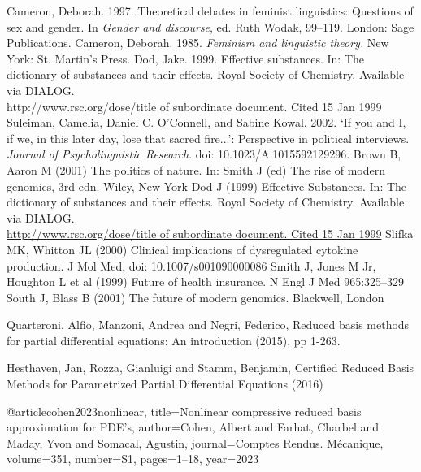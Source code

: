 \begin{thebibliography}{99.}
%
 Cameron, Deborah. 1997. Theoretical debates in feminist linguistics: Questions of sex and gender. In \textit{Gender and discourse}, ed. Ruth Wodak, 99--119. London: Sage Publications.
%
 Cameron, Deborah. 1985. \textit{Feminism and linguistic theory.} New York: St. Martin's Press.
%
 Dod, Jake. 1999. Effective substances. In: The dictionary of substances and their effects. Royal Society of Chemistry. Available via DIALOG. \\
http://www.rsc.org/dose/title of subordinate document. Cited 15 Jan 1999
%
 Suleiman, Camelia, Daniel C. O'Connell, and Sabine Kowal. 2002. `If you and I, if we, in this later day, lose that sacred fire...': Perspective in political interviews. \textit{Journal of Psycholinguistic Research}. doi: 10.1023/A:1015592129296.
%
%
%
%
%
%
%
 Brown B, Aaron M (2001) The politics of nature. In: Smith J (ed) The rise of modern genomics, 3rd edn. Wiley, New York 
%
 Dod J (1999) Effective Substances. In: The dictionary of substances and their effects. Royal Society of Chemistry. Available via DIALOG. \\
\url{http://www.rsc.org/dose/title of subordinate document. Cited 15 Jan 1999}
%
 Slifka MK, Whitton JL (2000) Clinical implications of dysregulated cytokine production. J Mol Med, doi: 10.1007/s001090000086
%
 Smith J, Jones M Jr, Houghton L et al (1999) Future of health insurance. N Engl J Med 965:325--329
%
 South J, Blass B (2001) The future of modern genomics. Blackwell, London 
%

Quarteroni, Alfio, Manzoni, Andrea and Negri, Federico, Reduced basis methods for partial differential equations: An introduction (2015), pp 1-263.

Hesthaven, Jan, Rozza, Gianluigi and Stamm, Benjamin, Certified Reduced Basis Methods for Parametrized Partial Differential Equations (2016)


@article{cohen2023nonlinear,
  title={Nonlinear compressive reduced basis approximation for PDE’s},
  author={Cohen, Albert and Farhat, Charbel and Maday, Yvon and Somacal, Agustin},
  journal={Comptes Rendus. M{\'e}canique},
  volume={351},
  number={S1},
  pages={1--18},
  year={2023}
}


\end{thebibliography}
